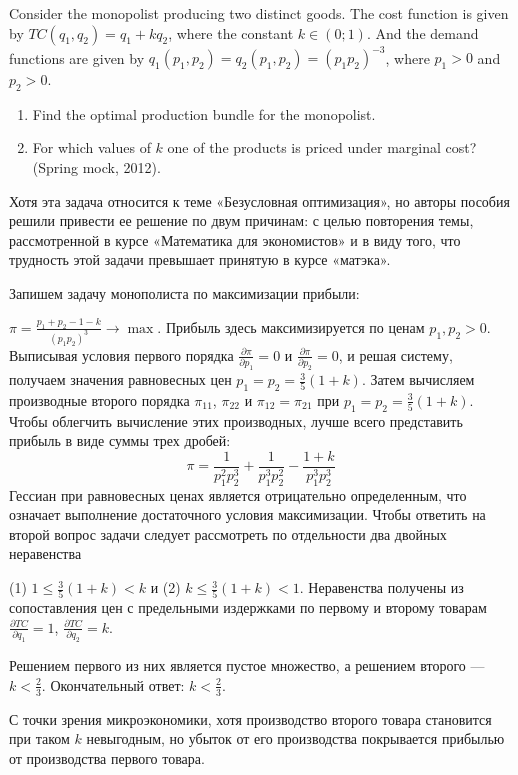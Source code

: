 \begin{problem}
Consider the monopolist producing two distinct goods. The cost function is given by $TC(q_{1} ,q_{2} )=q_{1} +kq_{2} $, where the constant $k\in (0;1)$. And the demand functions are given by $q_{1} (p_{1} ,p_{2} )=q_{2} (p_{1} ,p_{2} )=(p_{1} p_{2} )^{-3} $, where $p_1>0$ and $p_2>0$.

\begin{enumerate}
\item Find the optimal production bundle for the monopolist.
\item For which values of  $k$ one of the products is priced under marginal cost? (Spring mock, 2012).
\end{enumerate}



\begin{sol}
Хотя эта задача относится к теме «Безусловная оптимизация», но авторы пособия решили привести ее решение по двум причинам: с целью повторения темы, рассмотренной в курсе «Математика для экономистов» и в виду того, что трудность этой задачи превышает принятую в курсе «матэка».

Запишем задачу монополиста по максимизации прибыли:

$\pi =\frac{p_{1} +p_{2} -1-k}{(p_{1} p_{2} )^{3} } \to \max $. Прибыль здесь максимизируется по ценам $p_{1} ,p_{2} >0$. Выписывая условия первого порядка $\frac{\partial \pi }{\partial p_{1} } =0$ и $\frac{\partial \pi }{\partial p_{2} } =0$, и решая систему, получаем значения равновесных цен $p_{1} =p_{2} =\frac{3}{5} (1+k)$. Затем вычисляем производные второго порядка $\pi _{11} $, $\pi _{22} $ и $\pi _{12} =\pi _{21} $ при $p_{1} =p_{2} =\frac{3}{5} (1+k)$. Чтобы облегчить вычисление этих производных, лучше всего представить прибыль в виде суммы трех дробей:
\[
\pi =\frac{1}{p_{1}^{2} p_{2}^{3} } +\frac{1}{p_{1}^{3} p_{2}^{2} } -\frac{1+k}{p_{1}^{3} p_{2}^{3} }
\]
Гессиан при равновесных ценах является отрицательно определенным, что означает выполнение достаточного условия максимизации. Чтобы ответить на второй вопрос задачи следует рассмотреть по отдельности два двойных неравенства

(1) $1\le \frac{3}{5} (1+k)<k$ и (2) $k\le \frac{3}{5} (1+k)<1$. Неравенства получены из сопоставления цен с предельными издержками по первому и второму товарам $\frac{\partial TC}{\partial q_1}=1$, $\frac{\partial TC}{\partial q_2}=k$.


Решением первого из них является пустое множество, а решением второго --- $k < \frac{2}{3} $. Окончательный ответ: $k < \frac{2}{3} $.

С точки зрения микроэкономики, хотя производство второго товара становится при таком $k$ невыгодным, но убыток от его производства покрывается прибылью от производства первого товара.
\end{sol}
\end{problem}


